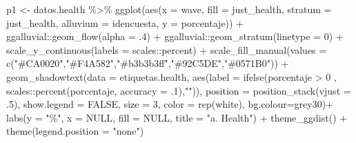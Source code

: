 \documentclass[
  12pt,
  letterpaper,
  DIV=11,
  numbers=noendperiod]{scrartcl}
\newenvironment{Shaded}{\begin{snugshade}}{\end{snugshade}}
\newcommand{\AttributeTok}[1]{\textcolor[rgb]{0.40,0.45,0.13}{#1}}
\newcommand{\ConstantTok}[1]{\textcolor[rgb]{0.56,0.35,0.01}{#1}}
\newcommand{\DecValTok}[1]{\textcolor[rgb]{0.68,0.00,0.00}{#1}}
\newcommand{\FunctionTok}[1]{\textcolor[rgb]{0.28,0.35,0.67}{#1}}
\newcommand{\NormalTok}[1]{\textcolor[rgb]{0.00,0.23,0.31}{#1}}
\newcommand{\OtherTok}[1]{\textcolor[rgb]{0.00,0.23,0.31}{#1}}
\newcommand{\SpecialCharTok}[1]{\textcolor[rgb]{0.37,0.37,0.37}{#1}}
\newcommand{\StringTok}[1]{\textcolor[rgb]{0.13,0.47,0.30}{#1}}
\begin{document}
\begin{Shaded}
\begin{Highlighting}[]
\NormalTok{p1 }\OtherTok{\textless{}{-}}\NormalTok{ datos.health }\SpecialCharTok{\%\textgreater{}\%} 
  \FunctionTok{ggplot}\NormalTok{(}\FunctionTok{aes}\NormalTok{(}\AttributeTok{x =}\NormalTok{ wave, }\AttributeTok{fill =}\NormalTok{ just\_health, }\AttributeTok{stratum =}\NormalTok{ just\_health,}
             \AttributeTok{alluvium =}\NormalTok{ idencuesta, }\AttributeTok{y =}\NormalTok{ porcentaje)) }\SpecialCharTok{+}
\NormalTok{  ggalluvial}\SpecialCharTok{::}\FunctionTok{geom\_flow}\NormalTok{(}\AttributeTok{alpha =}\NormalTok{ .}\DecValTok{4}\NormalTok{) }\SpecialCharTok{+} 
\NormalTok{  ggalluvial}\SpecialCharTok{::}\FunctionTok{geom\_stratum}\NormalTok{(}\AttributeTok{linetype =} \DecValTok{0}\NormalTok{) }\SpecialCharTok{+}
  \FunctionTok{scale\_y\_continuous}\NormalTok{(}\AttributeTok{labels =}\NormalTok{ scales}\SpecialCharTok{::}\NormalTok{percent) }\SpecialCharTok{+} 
  \FunctionTok{scale\_fill\_manual}\NormalTok{(}\AttributeTok{values =}  \FunctionTok{c}\NormalTok{(}\StringTok{"\#CA0020"}\NormalTok{,}\StringTok{"\#F4A582"}\NormalTok{,}\StringTok{"\#b3b3b3ff"}\NormalTok{,}\StringTok{"\#92C5DE"}\NormalTok{,}\StringTok{"\#0571B0"}\NormalTok{)) }\SpecialCharTok{+}
  \FunctionTok{geom\_shadowtext}\NormalTok{(}\AttributeTok{data =}\NormalTok{ etiquetas.health,}
                  \FunctionTok{aes}\NormalTok{(}\AttributeTok{label =} \FunctionTok{ifelse}\NormalTok{(porcentaje }\SpecialCharTok{\textgreater{}} \DecValTok{0}\NormalTok{ , scales}\SpecialCharTok{::}\FunctionTok{percent}\NormalTok{(porcentaje, }\AttributeTok{accuracy =}\NormalTok{ .}\DecValTok{1}\NormalTok{),}\StringTok{""}\NormalTok{)),}
                  \AttributeTok{position =} \FunctionTok{position\_stack}\NormalTok{(}\AttributeTok{vjust =}\NormalTok{ .}\DecValTok{5}\NormalTok{),}
                  \AttributeTok{show.legend =} \ConstantTok{FALSE}\NormalTok{,}
                  \AttributeTok{size =} \DecValTok{3}\NormalTok{,}
                  \AttributeTok{color =} \FunctionTok{rep}\NormalTok{(}\StringTok{\textquotesingle{}white\textquotesingle{}}\NormalTok{),}
                  \AttributeTok{bg.colour=}\StringTok{\textquotesingle{}grey30\textquotesingle{}}\NormalTok{)}\SpecialCharTok{+}
  \FunctionTok{labs}\NormalTok{(}\AttributeTok{y =} \StringTok{"\%"}\NormalTok{,}
       \AttributeTok{x =} \ConstantTok{NULL}\NormalTok{,}
       \AttributeTok{fill =} \ConstantTok{NULL}\NormalTok{,}
       \AttributeTok{title =} \StringTok{"a. Health"}\NormalTok{) }\SpecialCharTok{+}
  \FunctionTok{theme\_ggdist}\NormalTok{() }\SpecialCharTok{+}
  \FunctionTok{theme}\NormalTok{(}\AttributeTok{legend.position =} \StringTok{"none"}\NormalTok{) }
  



\end{Highlighting}
\end{Shaded}
\end{document}
